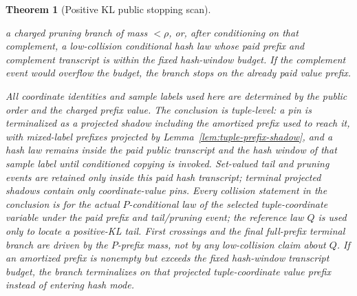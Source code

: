 \documentclass[11pt]{article}
\newtheorem{theorem}{Theorem}[section]
\begin{document}
\begin{theorem}[Positive KL public stopping scan]
\begin{enumerate}[label=\textup{(\arabic*)}]
  a charged pruning branch of mass $<\rho$, or, after conditioning on that
  complement, a low-collision conditional hash law whose paid prefix and
  complement transcript is within the fixed hash-window budget.  If the
  complement event would overflow the budget, the branch stops on the already
  paid value prefix.
  \end{enumerate}
All coordinate identities and sample labels used here are determined by the
public order and the charged prefix value.  The conclusion is tuple-level: a
pin is terminalized as a projected shadow including the amortized prefix used
to reach it, with mixed-label prefixes projected by
Lemma~\ref{lem:tuple-prefix-shadow}, and a hash law remains inside the paid
public transcript and the hash window of that sample label until conditioned
  copying is invoked.  Set-valued tail and pruning events are retained only
  inside this paid hash transcript; terminal projected shadows contain only
  coordinate-value pins.  Every
collision statement in the conclusion is for the actual
$P$-conditional law of the selected tuple-coordinate variable under the paid
prefix and tail/pruning event; the reference law $Q$ is used only to locate a
positive-KL tail.  First crossings and the final full-prefix terminal branch are
driven by the $P$-prefix mass, not by any low-collision claim about $Q$.
If an amortized prefix is nonempty but
  exceeds the fixed hash-window transcript budget, the branch terminalizes on
  that projected tuple-coordinate value prefix instead of entering hash mode.
\end{theorem}
\end{document}
